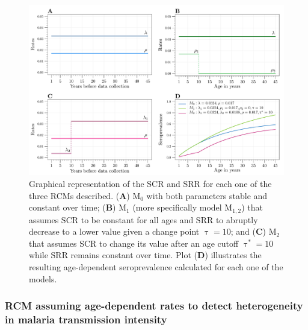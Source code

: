 \begin{figure}[th!]
    \center
    \includegraphics[width=\columnwidth]{images/RCM_structure.pdf}
    \caption[Representation of different possible RCMs]{Graphical representation of the SCR and SRR for each one of the three RCMs described. (\textbf{A}) $\text{M}_0$ with both parameters stable and constant over time; (\textbf{B}) $\text{M}_{1}$ (more specifically model M$_{1,2}$) that assumes SCR to be constant for all ages and SRR to abruptly decrease to a lower value given a change point $\uptau=10$; and (\textbf{C}) $\text{M}_2$ that assumes SCR to change its value after an age cutoff $\uptau^*=10$ while SRR remains constant over time. Plot (\textbf{D}) illustrates the resulting age-dependent seroprevalence calculated for each one of the models.
    }
\label{fig:rcm.models}
\end{figure}


\subsubsection{RCM assuming age-dependent rates to detect heterogeneity in malaria transmission intensity}

